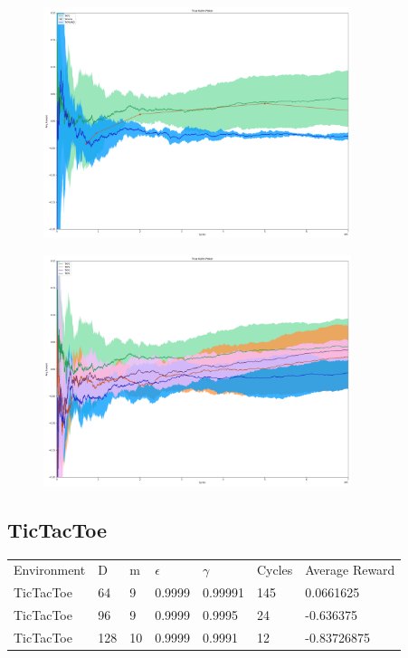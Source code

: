 \documentclass{article}
\theoremstyle{definition}
\newtheorem{primary statistics}[definition]{Primary Statistics}
\newtheorem{auxiliary statistics}[definition]{Auxiliary Statistics}
\begin{document}
 \begin{figure}[h]
 \centering
    \includegraphics[width=9cm]{RvVvU_True_Kuhn_Poker}
\end{figure}

 \begin{figure}[h]
 \centering
    \includegraphics[width=9cm]{BT_True_Kuhn_Poker}
\end{figure}

\newpage

\subsection{TicTacToe}
\begin{tabular}{lllllll}
 \centering
Environment & D & m & $\epsilon$ & $\gamma$ & Cycles & Average Reward \\
TicTacToe   & 64        & 9           & 0.9999      & 0.99991           & 145    & 0.0661625         \\
TicTacToe   & 96        & 9           & 0.9999      & 0.9995            & 24     & -0.636375         \\
TicTacToe   & 128       & 10          & 0.9999      & 0.9991            & 12     & -0.83726875        
\end{tabular}
\end{document}
